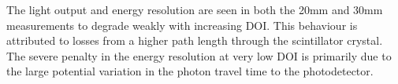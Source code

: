 The light output and energy resolution are seen in both the 20mm and 30mm measurements to degrade weakly with increasing DOI. This behaviour is attributed to losses from a higher path length through the scintillator crystal. The severe penalty in the energy resolution at very low DOI is primarily due to the large potential variation in the photon travel time to the photodetector.